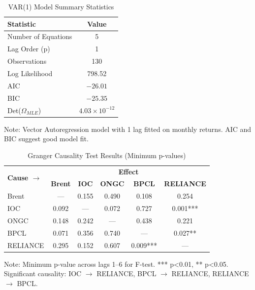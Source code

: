 \documentclass[11pt]{article}
\begin{document}
\begin{table}[htbp]
\centering
\caption{VAR(1) Model Summary Statistics}
\label{tab:var_summary}
\begin{tabular}{lc}
\toprule
\textbf{Statistic} & \textbf{Value} \\
\midrule
Number of Equations & 5 \\
Lag Order (p) & 1 \\
Observations & 130 \\
Log Likelihood & 798.52 \\
AIC & $-26.01$ \\
BIC & $-25.35$ \\
Det($\Omega_{MLE}$) & $4.03 \times 10^{-12}$ \\
\bottomrule
\end{tabular}
\begin{tablenotes}
\small
\item Note: Vector Autoregression model with 1 lag fitted on monthly returns. AIC and BIC suggest good model fit.
\end{tablenotes}
\end{table}

\begin{table}[htbp]
\centering
\caption{Granger Causality Test Results (Minimum p-values)}
\label{tab:granger}
\begin{tabular}{lccccc}
\toprule
\multirow{2}{*}{\textbf{Cause $\rightarrow$}} & \multicolumn{5}{c}{\textbf{Effect}} \\
\cmidrule(lr){2-6}
 & \textbf{Brent} & \textbf{IOC} & \textbf{ONGC} & \textbf{BPCL} & \textbf{RELIANCE} \\
\midrule
Brent     & --- & 0.155 & 0.490 & 0.108 & 0.254 \\
IOC       & 0.092 & --- & 0.072 & 0.727 & 0.001*** \\
ONGC      & 0.148 & 0.242 & --- & 0.438 & 0.221 \\
BPCL      & 0.071 & 0.356 & 0.740 & --- & 0.027** \\
RELIANCE  & 0.295 & 0.152 & 0.607 & 0.009*** & --- \\
\bottomrule
\end{tabular}
\begin{tablenotes}
\small
\item Note: Minimum p-value across lags 1--6 for F-test. *** p<0.01, ** p<0.05. Significant causality: IOC $\rightarrow$ RELIANCE, BPCL $\rightarrow$ RELIANCE, RELIANCE $\rightarrow$ BPCL.
\end{tablenotes}
\end{table}
\end{document}
